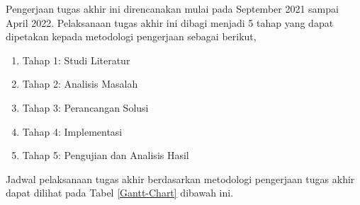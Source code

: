  Pengerjaan tugas akhir ini direncanakan mulai pada September 2021 sampai April 2022. Pelaksanaan tugas akhir ini dibagi menjadi 5 tahap yang dapat dipetakan kepada metodologi pengerjaan sebagai berikut,
 \begin{enumerate}
	     \item Tahap 1: Studi Literatur
	     \item Tahap 2: Analisis Masalah
	     \item Tahap 3: Perancangan Solusi
	     \item Tahap 4: Implementasi
	     \item Tahap 5: Pengujian dan Analisis Hasil
	 \end{enumerate}
 
 Jadwal pelaksanaan tugas akhir berdasarkan metodologi pengerjaan tugas akhir dapat dilihat pada Tabel \ref{Gantt-Chart} dibawah ini.
 \begin{table}[htb]
	 \centering
	 \caption{Gantt Chart jadwal pelaksanaan tugas akhir}
	 \label{Gantt-Chart}
	 \end{table}



